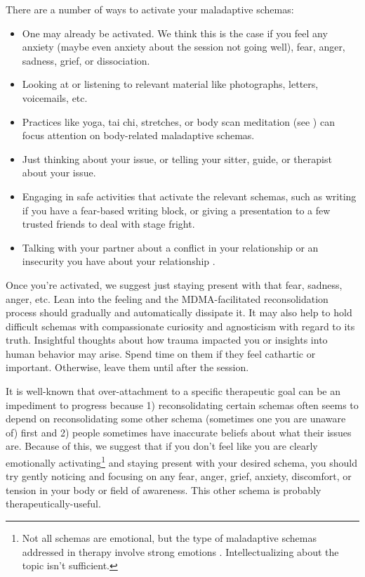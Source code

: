 \documentclass[12pt,letterpaper]{book}
\begin{document}
There are a number of ways to activate your maladaptive schemas:
\begin{itemize}
    \item One may already be activated. We think this is the case if you feel any anxiety (maybe even anxiety about the session not going well), fear, anger, sadness, grief, or dissociation.
    \item Looking at or listening to relevant material like photographs, letters, voicemails, etc.
    \item Practices like yoga, tai chi, stretches, or body scan meditation (see \textcite{bodyscan}) can focus attention on body-related maladaptive schemas.
    \item Just thinking about your issue, or telling your sitter, guide, or therapist about your issue.
    \item Engaging in safe activities that activate the relevant schemas, such as writing if you have a fear-based writing block, or giving a presentation to a few trusted friends to deal with stage fright.
    \item Talking with your partner about a conflict in your relationship or an insecurity you have about your relationship \cite{colbertEvenings}.
\end{itemize}
Once you're activated, we suggest just staying present with that fear, sadness, anger, etc. Lean into the feeling and the MDMA-facilitated reconsolidation process should gradually and automatically dissipate it. It may also help to hold difficult schemas with compassionate curiosity and agnosticism with regard to its truth. Insightful thoughts about how trauma impacted you or insights into human behavior may arise. Spend time on them if they feel cathartic or important. Otherwise, leave them until after the session.

It is well-known that over-attachment to a specific therapeutic goal can be an impediment to progress because 1) reconsolidating certain schemas often seems to depend on reconsolidating some other schema (sometimes one you are unaware of) first and 2) people sometimes have inaccurate beliefs about what their issues are. Because of this, we suggest that if you don't feel like you are clearly emotionally activating\footnote{Not all schemas are emotional, but the type of maladaptive schemas addressed in therapy involve strong emotions \cite{eckerUnlocking}. Intellectualizing about the topic isn't sufficient.} and staying present with your desired schema, you should try gently noticing and focusing on any fear, anger, grief, anxiety, discomfort, or tension in your body or field of awareness. This other schema is probably therapeutically-useful.
\end{document}
